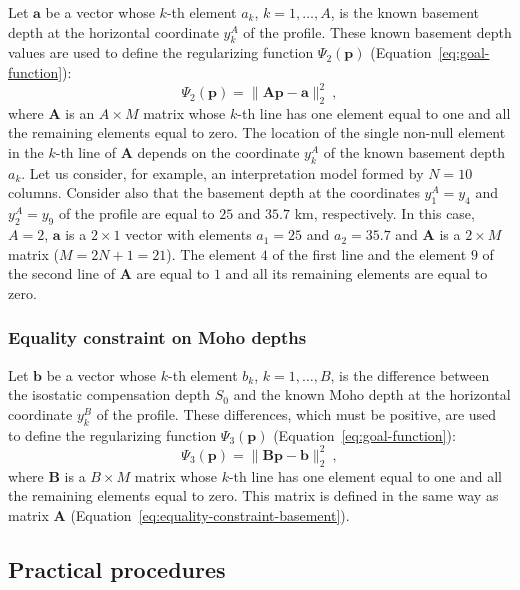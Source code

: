 \documentclass[manuscript]{geophysics}
\begin{document}
Let $\mathbf{a}$ be a vector whose $k$-th element $a_{k}$,
$k = 1, \dots, A$, is the known basement depth at the horizontal coordinate
$y^{A}_{k}$ of the profile. These known basement depth values are used to define 
the regularizing function $\Psi_{2}(\mathbf{p})$ 
(Equation~\ref{eq:goal-function}):
\begin{equation}
\Psi_{2}(\mathbf{p}) = \| \mathbf{A}\mathbf{p} - \mathbf{a} \|_{2}^{2} \: ,
\label{eq:equality-constraint-basement}
\end{equation}
where $\mathbf{A}$ is an $A \times M$ matrix whose $k$-th line has one element 
equal to one and all the remaining elements equal to zero. The location of the
single non-null element in the $k$-th line of $\mathbf{A}$ depends on the coordinate
$y^{A}_{k}$ of the known basement depth $a_{k}$. Let us consider, 
for example, an interpretation model formed by $N = 10$ columns. Consider also that 
the basement depth at the coordinates $y^{A}_{1} = y_{4}$ and $y^{A}_{2} = y_{9}$ of
the profile are equal to $25$ and $35.7$ km, respectively. In this case, $A = 2$,
$\mathbf{a}$ is a $2 \times 1$ vector with elements $a_{1} = 25$ and $a_{2} = 35.7$
and $\mathbf{A}$ is a $2 \times M$ matrix ($M = 2N + 1 = 21$). The element $4$ of the
first line and the element $9$ of the second line of $\mathbf{A}$ are equal to $1$ and
all its remaining elements are equal to zero.

\subsubsection*{Equality constraint on Moho depths}

Let $\mathbf{b}$ be a vector whose $k$-th element $b_{k}$,
$k = 1, \dots, B$, is the difference between the isostatic compensation depth
$S_{0}$ and the known Moho depth at the horizontal coordinate $y^{B}_{k}$ of the
profile. These differences, which must be positive, are used to define the 
regularizing function $\Psi_{3}(\mathbf{p})$ (Equation~\ref{eq:goal-function}):
\begin{equation}
\Psi_{3}(\mathbf{p}) = \| \mathbf{B}\mathbf{p} - \mathbf{b} \|_{2}^{2} \: ,
\label{eq:equality-constraint-moho}
\end{equation}
where $\mathbf{B}$ is a $B \times M$ matrix whose $k$-th line has one element 
equal to one and all the remaining elements equal to zero. This matrix is defined 
in the same way as matrix $\mathbf{A}$ (Equation~\ref{eq:equality-constraint-basement}).


\subsection{Practical procedures}
\end{document}
